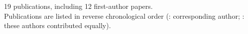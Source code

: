 

\begin{cvparagraph}
{\color{black}19 publications, including 12 first-author papers.\\
Publications are listed in reverse chronological order ({\acvbibfont *}: corresponding author; {\acvbibfont\textdagger}: these authors contributed equally).}
\end{cvparagraph}

\nocite{*}
\printbibliography[heading=none,keyword=firstauthor]

\vspace{0.4em}
\printbibliography[heading=none,notkeyword=firstauthor]
